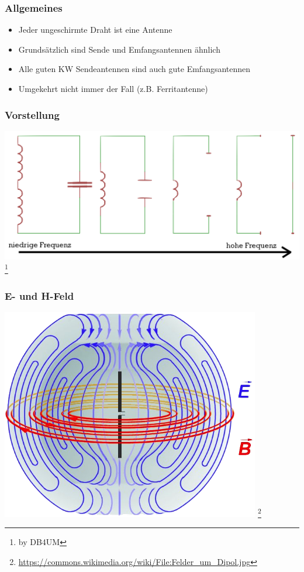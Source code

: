 \begin{frame}
    \frametitle{Allgemeines}
	\begin{itemize}
		\item Jeder ungeschirmte Draht ist eine Antenne
        \item Grundsätzlich sind Sende und Emfangsantennen ähnlich
        \item Alle guten KW Sendeantennen sind auch gute Emfangsantennen
       	\item Umgekehrt nicht immer der Fall (z.B. Ferritantenne)
    \end{itemize}
\end{frame}

\begin{frame}
    \frametitle{Vorstellung}
    \begin{center}
        \includegraphics[width=1\textwidth]{e11/dipol_entstehung.png}
        \footnote{\tiny by DB4UM}
	\end{center}
\end{frame}

\begin{frame}
    \frametitle{E- und H-Feld}
    \begin{center}
        \includegraphics[width=0.85\textwidth]{e11/Felder_um_Dipol.png}
        \footnote{\tiny \url{https://commons.wikimedia.org/wiki/File:Felder_um_Dipol.jpg}}
	\end{center}
\end{frame}


